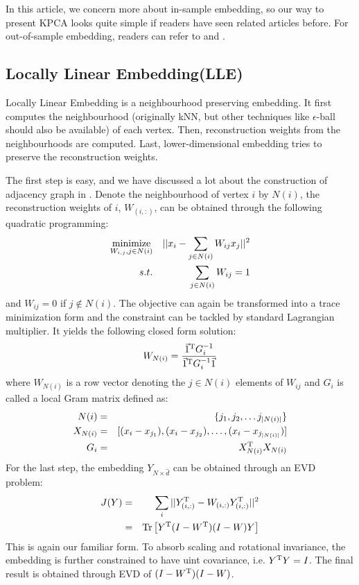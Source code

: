 In this article, we concern more about in-sample embedding, so 
our way to present KPCA looks quite simple if readers have 
seen related articles before. For out-of-sample embedding, 
readers can refer to \cite{scholkopf1998kpca} and \cite{bengio2004out}. 

\subsection{Locally Linear Embedding(LLE)}
\label{sec:lle}

Locally Linear Embedding\cite{roweis2000lle} is a neighbourhood
preserving embedding. It first computes the neighbourhood
(originally kNN, but other techniques like $ \epsilon $-ball 
should also be available) of each vertex. Then, reconstruction weights
from the neighbourhoods are computed. Last, lower-dimensional embedding
tries to preserve the reconstruction weights. 

The first step is easy, and we have discussed a lot about 
the construction of adjacency graph in \rsec{\ref{sec:metric}}. 
Denote the neighbourhood of vertex $ i $ by $ N(i) $, the 
reconstruction weights of $ i $, $ W_{(i,:)} $, can be 
obtained through the following quadratic programming:
\begin{eqnarray}
	\operatorname*{minimize}_{ W_{i,j}, j \in N(i) } && {||x_i - \sum_{j \in N(i)}{W_{ij}x_j}||^2} \\
	s.t. && \sum_{j \in N(i)} W_{ij} = 1 
\end{eqnarray}
and $ W_{ij} = 0 $ if $ j \notin N(i) $. 
The objective can again be transformed into a trace minimization form
and the constraint can be tackled by standard Lagrangian multiplier.
It yields the following closed form solution:
\begin{equation}
	W_{N(i)} = \frac{\vec{1}^\mathrm{T} G_i^{-1}}{\vec{1}^\mathrm{T} G_i^{-1} \vec{1}}
\end{equation}
where $ W_{N(i)} $ is a row vector denoting
the $ j \in N(i) $ elements of $ W_{ij} $ and 
$ G_i $ is called a local Gram matrix defined as:
\begin{eqnarray}
	N(i) &=& \{ j_1,j_2, \ldots j_{|N(i)|}\} \\
	X_{N(i)} &=& [(x_i - x_{j_1}), (x_i - x_{j_2}), \ldots, (x_i - x_{j_{|N(i)|}}) ] \\
	G_i &=& X_{N(i)} ^\mathrm{T} X_{N(i)}
\end{eqnarray}
For the last step, the embedding $ Y_{N \times \hat{d}} $ can be obtained 
through an EVD problem:
\begin{eqnarray}
	J(Y) &=& \sum_{i}||Y_{(i,:)}^\mathrm{T} - W_{(i,:)}Y_{(i,:)}^\mathrm{T}||^2 \\
	&=& \mathrm{Tr}\left[ Y^\mathrm{T} (I - W^\mathrm{T})(I - W) Y \right]
\end{eqnarray}
This is again our familiar form. To absorb scaling and rotational invariance, 
the embedding is further constrained to have uint covariance, i.e.
$ Y^\mathrm{T} Y = I $. The final result is obtained through EVD of 
$ (I - W^\mathrm{T})(I - W) $. 

